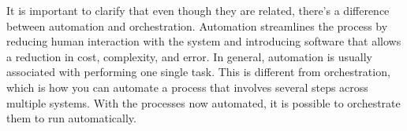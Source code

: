 It is important to clarify that even though they are related, there's a difference between automation and orchestration. Automation streamlines the process by reducing human interaction with the system and introducing software that allows a reduction in cost, complexity, and error. In general, automation is usually associated with performing one single task. This is different from orchestration, which is how you can automate a process that involves several steps across multiple systems. With the processes now automated, it is possible to orchestrate them to run automatically.














